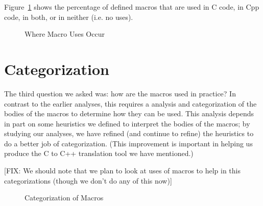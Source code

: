 Figure~\ref{fig:define_usage} shows the percentage of defined macros
that are used in C code, in Cpp code, in both, or in neither (i.e. no
uses).

\begin{figure}
{\small
  \setlength{\tabcolsep}{.25em}
}
\caption{Where Macro Uses Occur\label{fig:define_usage}}
\end{figure}


\section{Categorization}\label{sec:categorization}

The third question we asked was: how are the macros used in practice?
In contrast to the earlier analyses, this requires a analysis and
categorization of the bodies of the macros to determine how they can
be used.  This analysis depends in part on some heuristics we defined
to interpret the bodies of the macros; by studying our analyses, we
have refined (and continue to refine) the heuristics to do a better
job of categorization.  (This improvement is important in helping us
produce the C to C++ translation tool we have mentioned.)

[FIX: We should note that we plan to look at uses of macros to help in
this categorizations (though we don't do any of this now)]

\begin{figure}
{\small
  \setlength{\tabcolsep}{.25em}
}
\caption{Categorization of Macros\label{fig:categorization}}
\end{figure}

